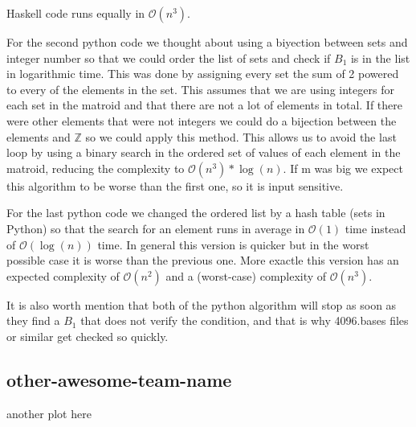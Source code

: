 \documentclass[11pt]{amsart}
\begin{document}
Haskell code runs equally in $\mathcal{O}(n^3)$.

For the second python code we thought about using a biyection between sets and integer number so that we could order the list of sets and check if $B_1$ is in the list in logarithmic time.
This was done by assigning every set the sum of 2 powered to every of the elements in the set. 
This assumes that we are using integers for each set in the matroid and that there are not a lot of elements in total. If there were other elements that were not integers we could do a bijection between the elements and $\mathbb{Z}$ so we could apply this method.
This allows us to avoid the last loop by using a binary search in the ordered set of values of each element in the matroid, reducing the complexity to $\mathcal{O}(n^3)*\log(n)$. 
If m was big we expect this algorithm to be worse than the first one, so it is input sensitive. 

For the last python code we changed the ordered list by a hash table (sets in Python) so that the search for an element runs in average in $\mathcal{O}(1)$ time instead of $\mathcal{O}(\log(n))$ time.
In general this version is quicker but in the worst possible case it is worse than the previous one.
More exactle this version has an expected complexity of $\mathcal{O}(n^2)$ and a (worst-case) complexity of $\mathcal{O}(n^3)$.

It is also worth mention that both of the python algorithm will stop as soon as they find a $B_1$ that does not verify the condition, and that is why 4096.bases files or similar get checked so quickly.


\subsection{other-awesome-team-name}

another plot here
\end{document}
